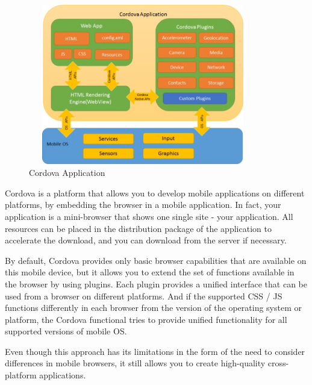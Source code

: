 \begin{figure}[h]
\centering
\includegraphics[width=10cm, height=7cm]{img/Cordova.jpg}
\caption{Cordova Application}
\end{figure}

Cordova is a platform that allows you to develop mobile applications on different platforms, by embedding the browser in a mobile application. In fact, your application is a mini-browser that shows one single site - your application. All resources can be placed in the distribution package of the application to accelerate the download, and you can download from the server if necessary.\par
By default, Cordova provides only basic browser capabilities that are available on this mobile device, but it allows you to extend the set of functions available in the browser by using plugins. Each plugin provides a unified interface that can be used from a browser on different platforms. And if the supported CSS / JS functions differently in each browser from the version of the operating system or platform, the Cordova functional tries to provide unified functionality for all supported versions of mobile OS.\par
Even though this approach has its limitations in the form of the need to consider differences in mobile browsers, it still allows you to create high-quality cross-platform applications. \cite{Cordova}

